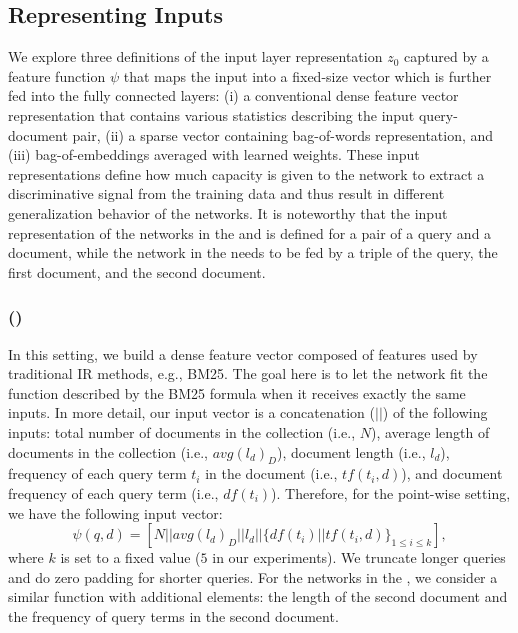 \subsection{Representing Inputs}
\label{sec:feedings}
We explore three definitions of the input layer representation $z_0$ captured by a feature function $\psi$ that maps the input into a fixed-size vector which is further fed into the fully connected layers: 
(i) a conventional dense feature vector representation that contains various statistics describing the input query-document pair, 
(ii) a sparse vector containing bag-of-words representation, and 
(iii) bag-of-embeddings averaged with learned weights. 
These input representations define how much capacity is given to the network to extract a discriminative signal from the training data and thus result in different generalization behavior of the networks. 
It is noteworthy that the input representation of the networks in the \modelone and \modeltwo is defined for a pair of a query and a document, while the network in the \modelthree needs to be fed by a triple of the query, the first document, and the second document.

\subsubsection{\Feedone (\fone)} 
In this setting, we build a dense feature vector composed of features used by traditional IR methods, e.g., BM25. The goal here is to let the network fit the function described by the BM25 formula when it receives exactly the same inputs. 
In more detail, our input vector is a concatenation ($||$) of the following inputs: total number of documents in the collection (i.e., $N$), average length of documents in the collection (i.e., $avg(l_d)_D$), document length (i.e., $l_d$), frequency of each query term $t_i$ in the document (i.e., $tf(t_i, d)$), and document frequency of each query term (i.e., $df(t_i)$). Therefore, for the point-wise setting, we have the following input vector:
\begin{equation}
\psi(q, d) = [N || avg(l_d)_D || l_d || \{df(t_i) || tf(t_i,d)\}_{1 \leq i \leq k}],
\end{equation}
where $k$ is set to a fixed value ($5$ in our experiments). 
We truncate longer queries and do zero padding for shorter queries. 
For the networks in the \modelthree, we consider a similar function with additional elements: the length of the second document and the frequency of query terms in the second document.


